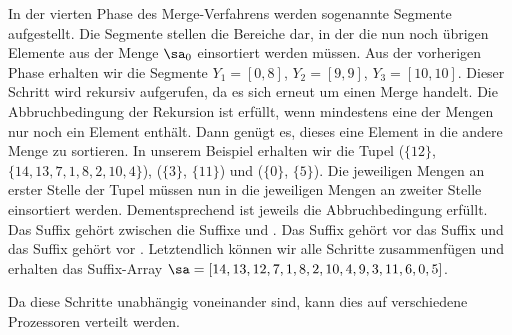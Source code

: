 In der vierten Phase des Merge-Verfahrens werden sogenannte Segmente aufgestellt. Die Segmente stellen die Bereiche dar, in der die nun noch übrigen Elemente aus der Menge $\sa_0$ einsortiert werden müssen. Aus der vorherigen Phase erhalten wir die Segmente $Y_1 = [0, 8]$, $Y_2 = [9, 9]$, $Y_3 = [10, 10]$. Dieser Schritt wird rekursiv aufgerufen, da es sich erneut um einen Merge handelt. Die Abbruchbedingung der Rekursion ist erfüllt, wenn mindestens eine der Mengen nur noch ein Element enthält. Dann genügt es, dieses eine Element in die andere Menge zu sortieren. 
In unserem Beispiel erhalten wir die Tupel ($\{12\}$, $\{14, 13, 7, 1, 8, 2, 10, 4\}$), ($\{3\}$, $\{11\}$) und ($\{0\}$, $\{5\}$). Die jeweiligen Mengen an erster Stelle der Tupel müssen nun in die jeweiligen Mengen an zweiter Stelle einsortiert werden. Dementsprechend ist jeweils die Abbruchbedingung erfüllt. Das Suffix  gehört zwischen die Suffixe  und . Das Suffix  gehört vor das Suffix  und das Suffix  gehört vor .
Letztendlich können wir alle Schritte zusammenfügen und erhalten das Suffix-Array $\sa = [14, 13, 12, 7, 1, 8, 2, 10, 4, 9, 3, 11, 6, 0, 5]$.

Da diese Schritte unabhängig voneinander sind, kann dies auf verschiedene Prozessoren verteilt werden.